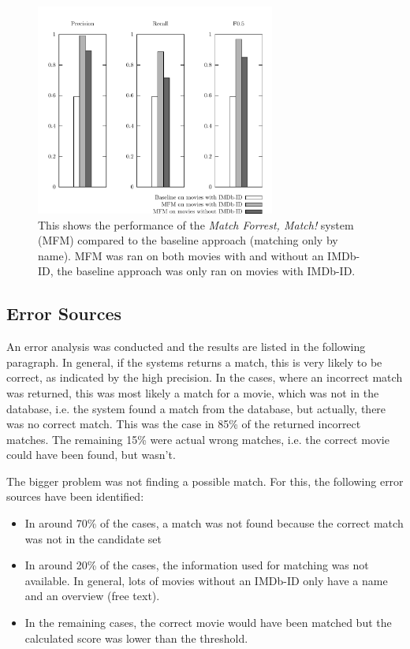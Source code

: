 \begin{figure}[h!]
  \begin{center}
  \includegraphics[width=0.7\textwidth]{images/baseline.pdf}
  \end{center}
  \caption{This shows the performance of the \emph{Match Forrest, Match!} system (MFM) compared to the baseline approach (matching only by name). MFM was ran on both movies with and without an IMDb-ID, the baseline approach was only ran on movies with IMDb-ID.}
  \label{fig_baseline}
\end{figure}

\subsection{Error Sources}
An error analysis was conducted and the results are listed in the following paragraph.
In general, if the systems returns a match, this is very likely to be correct, as indicated by the high precision.
In the cases, where an incorrect match was returned, this was most likely a match for a movie, which was not in the database, i.e. the system found a match from the database, but actually, there was no correct match.
This was the case in 85\% of the returned incorrect matches.
The remaining 15\% were actual wrong matches, i.e. the correct movie could have been found, but wasn't.

The bigger problem was not finding a possible match.
For this, the following error sources have been identified:

\begin{itemize}
	\item
    In around 70\% of the cases, a match was not found because the correct match was not in the candidate set
	\item
    In around 20\% of the cases, the information used for matching was not available.
    In general, lots of movies without an IMDb-ID only have a name and an overview (free text).
	\item
    In the remaining cases, the correct movie would have been matched but the calculated score was lower than the threshold.
\end{itemize}
